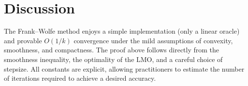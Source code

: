 \documentclass{article}
\begin{document}
\section*{Discussion}
The Frank–Wolfe method enjoys a simple implementation (only a linear oracle) and provable $O(1/k)$ convergence under the mild assumptions of convexity, smoothness, and compactness.  
The proof above follows directly from the smoothness inequality, the optimality of the LMO, and a careful choice of stepsize.  
All constants are explicit, allowing practitioners to estimate the number of iterations required to achieve a desired accuracy.
\end{document}
